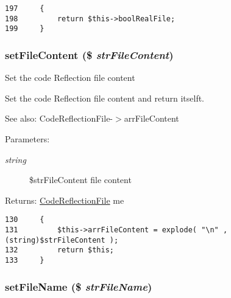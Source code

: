 \begin{Code}\begin{verbatim}197     {
198         return $this->boolRealFile;
199     }
\end{verbatim}
\end{Code}


\hypertarget{class_code_reflection_file_7b63a5adb1ae468f9cae2f4ee183f61b}{
\subsubsection[{setFileContent}]{\setlength{\rightskip}{0pt plus 5cm}setFileContent (\$ {\em strFileContent})}}
\label{class_code_reflection_file_7b63a5adb1ae468f9cae2f4ee183f61b}


Set the code Reflection file content

Set the code Reflection file content and return itselft.

\begin{Desc}
\item[See also:]CodeReflectionFile-$>$arrFileContent \end{Desc}
\begin{Desc}
\item[Parameters:]
\begin{description}
\item[{\em string}]\$strFileContent file content \end{description}
\end{Desc}
\begin{Desc}
\item[Returns:]\hyperlink{class_code_reflection_file}{CodeReflectionFile} me \end{Desc}


\begin{Code}\begin{verbatim}130     {
131         $this->arrFileContent = explode( "\n" , (string)$strFileContent );
132         return $this;
133     }
\end{verbatim}
\end{Code}


\hypertarget{class_code_reflection_file_14fd91733dbcc57d74df9c22e0c84e72}{
\subsubsection[{setFileName}]{\setlength{\rightskip}{0pt plus 5cm}setFileName (\$ {\em strFileName})}}
\label{class_code_reflection_file_14fd91733dbcc57d74df9c22e0c84e72}


